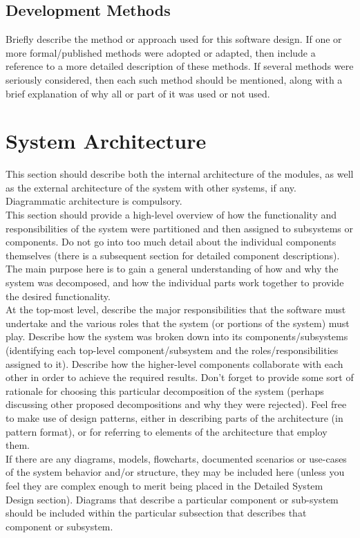 \documentclass{FastFyp}
\begin{document}
\subsection{ Development Methods}
Briefly describe the method or approach used for this software design. If one or more formal/published methods were adopted or adapted, then include a reference to a more detailed description of these methods. If several methods were seriously considered, then each such method should be mentioned, along with a brief explanation of why all or part of it was used or not used.
\section{System Architecture}
This section should describe both the internal architecture of the modules, as well as the external architecture of the system with other systems, if any. Diagrammatic architecture is compulsory.\\
This section should provide a high-level overview of how the functionality and responsibilities of the system were partitioned and then assigned to subsystems or components. Do not go into too much detail about the individual components themselves (there is a subsequent section for detailed component descriptions). The main purpose here is to gain a general understanding of how and why the system was decomposed, and how the individual parts work together to provide the desired functionality.\\
At the top-most level, describe the major responsibilities that the software must undertake and the various roles that the system (or portions of the system) must play. Describe how the system was broken down into its components/subsystems (identifying each top-level component/subsystem and the roles/responsibilities assigned to it). Describe how the higher-level components collaborate with each other in order to achieve the required results. Don't forget to provide some sort of rationale for choosing this particular decomposition of the system (perhaps discussing other proposed decompositions and why they were rejected). Feel free to make use of design patterns, either in describing parts of the architecture (in pattern format), or for referring to elements of the architecture that employ them.\\
If there are any diagrams, models, flowcharts, documented scenarios or use-cases of the system behavior and/or structure, they may be included here (unless you feel they are complex enough to merit being placed in the Detailed System Design section). Diagrams that describe a particular component or sub-system should be included within the particular subsection that describes that component or subsystem.\\
\end{document}

